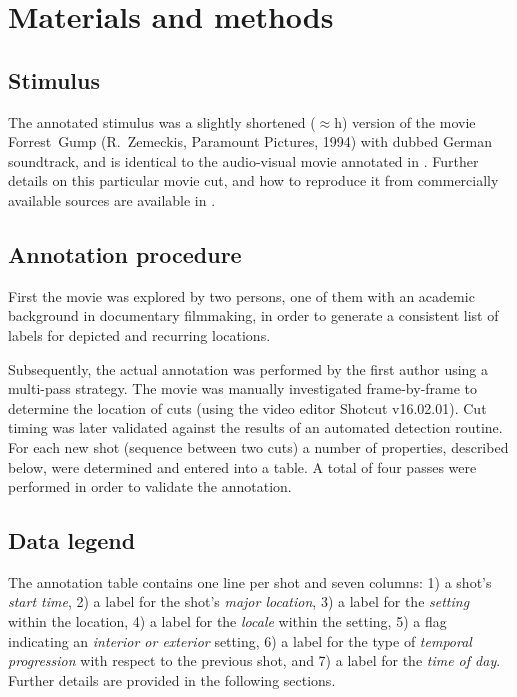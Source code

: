 \documentclass[10pt,a4paper,twocolumn]{article}
\begin{document}
\section*{Materials and methods}

\subsection*{Stimulus}

The annotated stimulus was a slightly shortened ($\approx$\unit[2]{h}) version
of the movie Forrest~Gump (R.~Zemeckis, Paramount Pictures, 1994) with dubbed
German soundtrack, and is identical to the audio-visual movie annotated in
\cite{LRS+2015}. Further details on this particular movie cut, and how to
reproduce it from commercially available sources are available in
\cite{HAK+16}.


\subsection*{Annotation procedure}

First the movie was explored by two persons, one of them with an academic
background in documentary filmmaking, in order to generate a consistent list of
labels for depicted and recurring locations.

Subsequently, the actual annotation was performed by the first author using a
multi-pass strategy. The movie was manually investigated frame-by-frame to
determine the location of cuts (using the video editor Shotcut v16.02.01). Cut
timing was later validated against the results of an automated detection
routine. For each new shot (sequence between two cuts) a number of properties,
described below, were determined and entered into a table. A total of four
passes were performed in order to validate the annotation.


\subsection*{Data legend}

The annotation table contains one line per shot and
seven columns: 1) a shot's \textit{start time}, 2) a label for the shot's
\textit{major location}, 3) a label for the \textit{setting} within the
location, 4) a label for the \textit{locale} within the setting, 5) a flag
indicating an \textit{interior or exterior} setting, 6) a label for the type of
\textit{temporal progression} with respect to the previous shot, and 7) a label
for the \textit{time of day}. Further details are provided in the following
sections.
\end{document}
